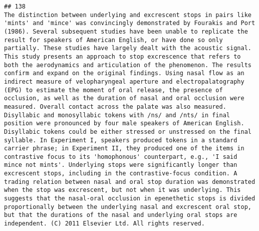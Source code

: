 \documentclass[
  english,
  man]{apa6}
\begin{document}
\begin{verbatim}
## 138                                                                                                                                                                                                                                                                                                                                                                                                                                                                                                                                                                                                                                                                                                                                                                                                                                                          The distinction between underlying and excrescent stops in pairs like 'mints' and 'mince' was convincingly demonstrated by Fourakis and Port (1986). Several subsequent studies have been unable to replicate the result for speakers of American English, or have done so only partially. These studies have largely dealt with the acoustic signal. This study presents an approach to stop excrescence that refers to both the aerodynamics and articulation of the phenomenon. The results confirm and expand on the original findings. Using nasal flow as an indirect measure of velopharyngeal aperture and electropalatography (EPG) to estimate the moment of oral release, the presence of occlusion, as well as the duration of nasal and oral occlusion were measured. Overall contact across the palate was also measured. Disyllabic and monosyllabic tokens with /ns/ and /nts/ in final position were pronounced by four male speakers of American English. Disyllabic tokens could be either stressed or unstressed on the final syllable. In Experiment I, speakers produced tokens in a standard carrier phrase; in Experiment II, they produced one of the items in contrastive focus to its 'homophonous' counterpart, e.g., 'I said mince not mints'. Underlying stops were significantly longer than excrescent stops, including in the contrastive-focus condition. A trading relation between nasal and oral stop duration was demonstrated when the stop was excrescent, but not when it was underlying. This suggests that the nasal-oral occlusion in epenethetic stops is divided proportionally between the underlying nasal and excrescent oral stop, but that the durations of the nasal and underlying oral stops are independent. (C) 2011 Elsevier Ltd. All rights reserved.

\end{verbatim}
\end{document}
